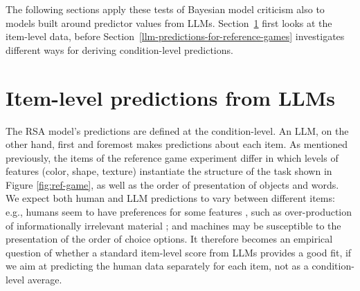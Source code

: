 \documentclass[fleqn]{article}
\begin{document}
The following sections apply these tests of Bayesian model criticism also to models built around predictor values from LLMs.
Section~\ref{sec:item-level-pred} first looks at the item-level data, before Section~\ref{llm-predictions-for-reference-games} investigates different ways for deriving condition-level predictions.

\section{Item-level predictions from LLMs}
\label{sec:item-level-pred}

The RSA model's predictions are defined at the condition-level.
An LLM, on the other hand, first and foremost makes predictions about each item.
As mentioned previously, the items of the reference game experiment differ in which levels of features (color, shape, texture) instantiate the structure of the task shown in Figure \ref{fig:ref-game}, as well as the order of presentation of objects and words.
We expect both human and LLM predictions to vary between different items: e.g., humans seem to have preferences for some features \citep[e.g.,][]{QingFranke2013:Variations-on-a}, such as over-production of informationally irrelevant material \citep[e.g.,][]{DaviesKatsos2010:Over-informativ,Rubio-Fernandez2019:Overinformative,DegenHawkins2020:When-redundancy}; and machines may be susceptible to the presentation of the order of choice options. 
It therefore becomes an empirical question of whether a standard item-level score from LLMs provides a good fit, if we aim at predicting the human data separately for each item, not as a condition-level average.
\end{document}

